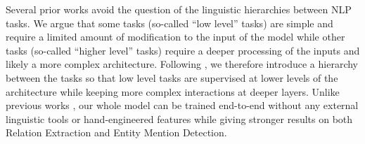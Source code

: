 \documentclass[letterpaper]{article} %
\begin{document}
\begin{table}
    \caption{A few examples motivating our selection of tasks. \newline Abbreviations: CR: Coreference Resolution, RE: Relation Extraction, EMD: Entity Mention Detection, NER: Named Entity Recognition, X $\rightsquigarrow$ Y: X is more likely to be Y.}
    \label{tab:motivating_examples}
    \centering
\end{table}

Several prior works \cite{Yang2016,BingelS17} avoid the question of the linguistic hierarchies between NLP tasks. We argue that some tasks (so-called ``low level'' tasks) are simple and require a limited amount of modification to the input of the model while other tasks (so-called ``higher level'' tasks) require a deeper processing of the inputs and likely a more complex architecture. Following \cite{Hashimoto2017,Sogaard2016}, we therefore introduce a hierarchy between the tasks so that low level tasks are supervised at lower levels of the architecture while keeping more complex interactions at deeper layers.
Unlike previous works \cite{Li2014,Miwa2016}, our whole model can be trained end-to-end without any external linguistic tools or hand-engineered features while giving stronger results on both Relation Extraction and Entity Mention Detection.
\end{document}
